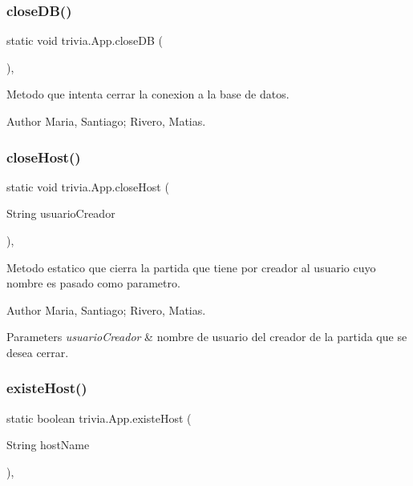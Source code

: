 \subsubsection{\texorpdfstring{close\+D\+B()}{closeDB()}}
{\footnotesize\ttfamily static void trivia.\+App.\+close\+DB (\begin{DoxyParamCaption}{ }\end{DoxyParamCaption})\hspace{0.3cm}{\ttfamily [inline]}, {\ttfamily [static]}}

Metodo que intenta cerrar la conexion a la base de datos. \begin{DoxyAuthor}{Author}
Maria, Santiago; Rivero, Matias. 
\end{DoxyAuthor}
\mbox{\label{classtrivia_1_1App_a4753bc6610d49e0d101c01d00b4b99d6}} 
\subsubsection{\texorpdfstring{close\+Host()}{closeHost()}}
{\footnotesize\ttfamily static void trivia.\+App.\+close\+Host (\begin{DoxyParamCaption}\item[{String}]{usuario\+Creador }\end{DoxyParamCaption})\hspace{0.3cm}{\ttfamily [inline]}, {\ttfamily [static]}}

Metodo estatico que cierra la partida que tiene por creador al usuario cuyo nombre es pasado como parametro. \begin{DoxyAuthor}{Author}
Maria, Santiago; Rivero, Matias. 
\end{DoxyAuthor}

\begin{DoxyParams}{Parameters}
{\em usuario\+Creador} & nombre de usuario del creador de la partida que se desea cerrar. \\
\hline
\end{DoxyParams}
\mbox{\label{classtrivia_1_1App_a0ba549b8577987ac6565b91ad65d6cce}} 
\subsubsection{\texorpdfstring{existe\+Host()}{existeHost()}}
{\footnotesize\ttfamily static boolean trivia.\+App.\+existe\+Host (\begin{DoxyParamCaption}\item[{String}]{host\+Name }\end{DoxyParamCaption})\hspace{0.3cm}{\ttfamily [inline]}, {\ttfamily [static]}}

